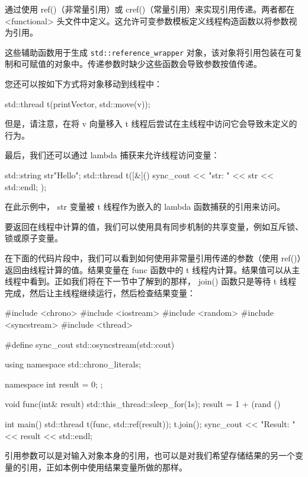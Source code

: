 通过使用 ref()（非常量引用）或 cref()（常量引用）来实现引用传递。两者都在 <functional> 头文件中定义。这允许可变参数模板定义线程构造函数以将参数视为引用。

这些辅助函数用于生成 \verb|std::reference_wrapper| 对象，该对象将引用包装在可复制和可赋值的对象中。传递参数时缺少这些函数会导致参数按值传递。

您还可以按如下方式将对象移动到线程中：

\begin{cpp}
std::thread t(printVector, std::move(v));
\end{cpp}

但是，请注意，在将 v 向量移入 t 线程后尝试在主线程中访问它会导致未定义的行为。

最后，我们还可以通过 lambda 捕获来允许线程访问变量：

\begin{cpp}
std::string str{"Hello"};
std::thread t([&]() {
    sync_cout << "str: " << str << std::endl;
});
\end{cpp}

在此示例中， str 变量被 t 线程作为嵌入的 lambda 函数捕获的引用来访问。


要返回在线程中计算的值，我们可以使用具有同步机制的共享变量，例如互斥锁、锁或原子变量。

在下面的代码片段中，我们可以看到如何使用非常量引用传递的参数（使用 ref()）返回由线程计算的值。结果变量在 func 函数中的 t 线程内计算。结果值可以从主线程中看到。正如我们将在下一节中了解到的那样， join() 函数只是等待 t 线程完成，然后让主线程继续运行，然后检查结果变量：

\begin{cpp}
#include <chrono>
#include <iostream>
#include <random>
#include <syncstream>
#include <thread>

#define sync_cout std::osyncstream(std::cout)

using namespace std::chrono_literals;

namespace {
    int result = 0;
};

void func(int& result) {
    std::this_thread::sleep_for(1s);
    result = 1 + (rand () %
}

int main() {
    std::thread t(func, std::ref(result));
    t.join();
    sync_cout << "Result: " << result << std::endl;
}
\end{cpp}

引用参数可以是对输入对象本身的引用，也可以是对我们希望存储结果的另一个变量的引用，正如本例中使用结果变量所做的那样。

